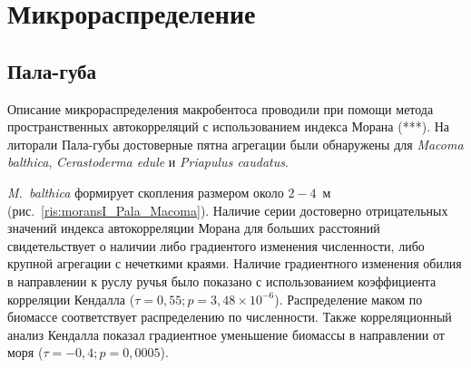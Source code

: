 \section{Микрораспределение}	
	\subsection{Пала-губа}
Описание микрораспределения макробентоса проводили при помощи метода пространственных автокорреляций с использованием индекса Морана (***).
На литорали Пала-губы достоверные пятна агрегации были обнаружены для {\it Macoma balthica}, {\it Cerastoderma edule} и {\it Priapulus caudatus}. 

{\it M.~balthica} формирует скопления размером около $2-4$~м (рис.~\ref{ris:moransI_Pala_Macoma}). 
Наличие серии достоверно отрицательных значений индекса автокорреляции Морана для больших расстояний свидетельствует о наличии либо градиентого изменения численности, либо крупной агрегации с нечеткими краями.
Наличие градиентного изменения обилия в направлении к руслу ручья было показано с использованием коэффициента корреляции Кендалла ($\tau = 0,55; p = 3,48 \times 10^{-6}$).
Распределение маком по биомассе соответствует распределению по численности. Также корреляционный анализ Кендалла показал градиентное уменьшение биомассы в направлении от моря ($\tau = -0,4; p = 0,0005$).


